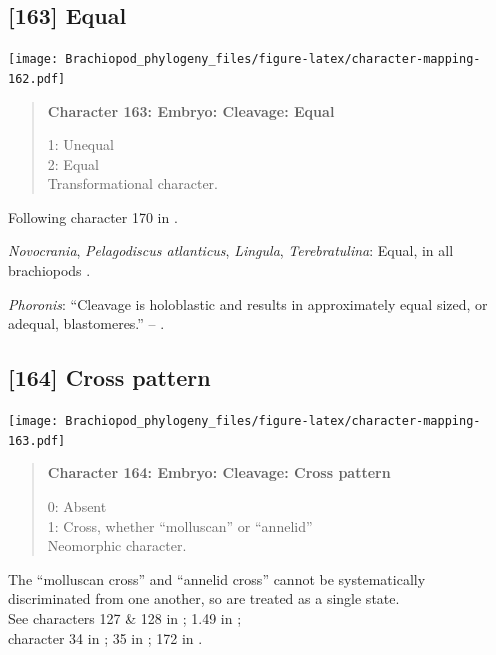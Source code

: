 \documentclass[openany]{book}
\begin{document}
\subsection*{{[}163{]} Equal}\label{equal}

\texttt{[image: Brachiopod\_phylogeny\_files/figure-latex/character-mapping-162.pdf]}

\begin{quote}
\textbf{Character 163: Embryo: Cleavage: Equal}

1: Unequal\\
2: Equal\\
Transformational character.
\end{quote}

Following character 170 in \citet{Giribet2002}.

\hypertarget{Lingula-coding-163}{}
\emph{Novocrania}, \emph{Pelagodiscus atlanticus}, \emph{Lingula},
\emph{Terebratulina}: Equal, in all brachiopods
\citep{Williams1997Introduction}.

\hypertarget{Phoronis-coding-163}{}
\emph{Phoronis}: ``Cleavage is holoblastic and results in approximately
equal sized, or adequal, blastomeres.'' -- \citet{Pennerstorfer2012}.

\subsection*{{[}164{]} Cross pattern}\label{cross-pattern}

\texttt{[image: Brachiopod\_phylogeny\_files/figure-latex/character-mapping-163.pdf]}

\begin{quote}
\textbf{Character 164: Embryo: Cleavage: Cross pattern}

0: Absent\\
1: Cross, whether ``molluscan'' or ``annelid''\\
Neomorphic character.
\end{quote}

The ``molluscan cross'' and ``annelid cross'' cannot be systematically
discriminated from one another, so are treated as a single state.\\
See characters 127 \& 128 in \citet{Rouse1999}; 1.49 in
\citet{SPS1996};\\
character 34 in \citet{Haszprunar1996}; 35 in \citet{Haszprunar2000};
172 in \citet{Giribet2002}.
\end{document}
